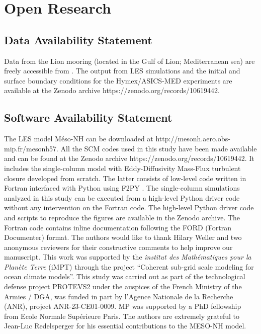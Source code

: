 \documentclass[draft]{agujournal2019}
\begin{document}
\section*{Open Research}
\subsection*{Data Availability Statement}
Data from the Lion mooring (located in the Gulf of Lion; Mediterranean sea) are 
freely accessible from . The output from LES simulations 
and the initial and surface boundary conditions for the Hymex/ASICS-MED experiments
are available at the Zenodo archive https://zenodo.org/records/10619442.
\subsection*{Software Availability Statement}
The LES model Méso-NH can be downloaded at http://mesonh.aero.obs-mip.fr/mesonh57. All the SCM codes used in this study have been made available and can be found 
at the Zenodo archive https://zenodo.org/records/10619442. It includes the single-column model with Eddy-Diffusivity 
Mass-Flux turbulent closure developed from scratch. The latter consists of low-level code written in Fortran 
interfaced with Python using F2PY \cite{peterson_f2py_2009}. The single-column simulations analyzed in
this study can be executed from a high-level Python driver code without any intervention 
on the Fortran code. The high-level Python driver code and scripts to reproduce the figures 
are available in the Zenodo archive. The Fortran code contains inline documentation following 
the FORD (Fortran Documenter) format. 
%
\acknowledgments
The authors would like to thank Hilary Weller and two anonymous reviewers for their constructive comments to help improve our manuscript. 
This work was supported by the \textit{institut des Mathématiques pour la Planète Terre} (iMPT) through 
the project ``Coherent sub-grid scale modeling for ocean climate models''.
This study was carried out as part of the technological defense project  PROTEVS2 under the 
auspices of the French Ministry of the Armies / DGA, was funded in part by l’Agence Nationale de la Recherche (ANR), project
ANR-23-CE01-0009. MP was supported by a PhD fellowship from Ecole Normale Supérieure Paris.
The authors are extremely grateful to Jean-Luc Redelsperger for his essential contributions to 
the MESO-NH model. 
   

\end{document}
